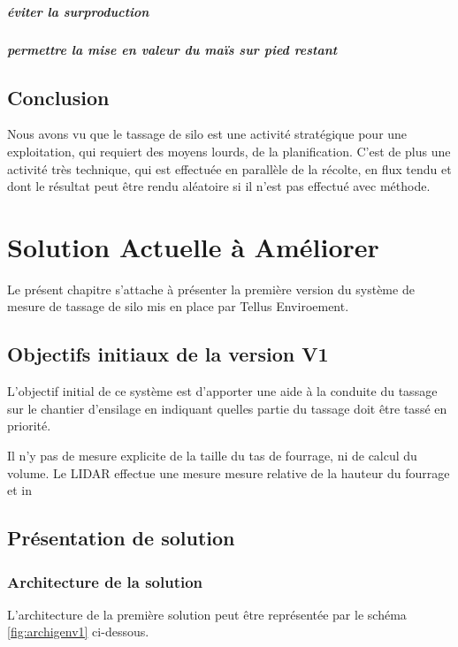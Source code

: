 \documentclass[12pt,a4paper]{report}
\begin{document}
\paragraph{éviter la surproduction}

\paragraph{permettre la mise en valeur du maïs sur pied restant}




\section{Conclusion}
Nous avons vu que le tassage de silo est une activité stratégique pour une exploitation, qui requiert des moyens lourds, de la planification. C'est de plus une activité très technique, qui est effectuée en parallèle de la récolte, en flux tendu et dont le résultat peut être rendu aléatoire si il n'est pas effectué avec méthode.

\chapter{Solution Actuelle à Améliorer}
Le présent chapitre s'attache à présenter la première version du système de mesure de tassage de silo mis en place par Tellus Enviroement.
\section{Objectifs initiaux de la version V1}
L'objectif initial de ce système est d'apporter une aide à la conduite du tassage sur le chantier d'ensilage en indiquant quelles partie du tassage doit être tassé en priorité.
\newline

Il n'y pas de mesure explicite de la taille du tas de fourrage, ni de calcul du volume. Le LIDAR effectue une mesure mesure relative de la hauteur du fourrage et in

\section{Présentation de solution}
\subsection{Architecture de la solution}

L'architecture de la première solution peut être représentée par le schéma \ref{fig:archigenv1} ci-dessous.
\end{document}
